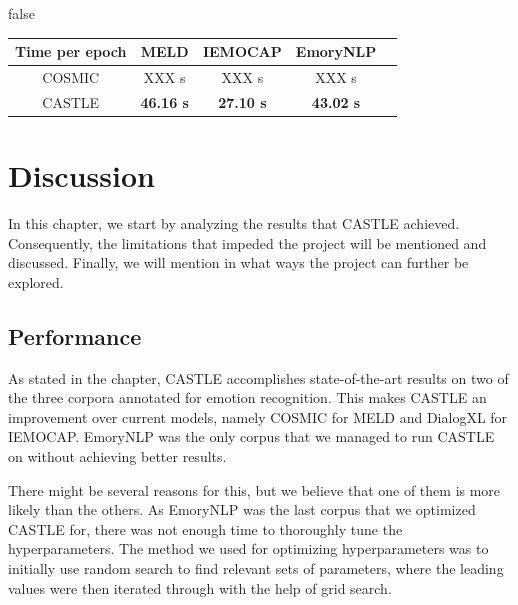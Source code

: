 \documentclass[nofilelist]{cslthse-msc}
\begin{document}



\ifx false
\begin{table}[h!]
\begin{tabular}{|c|c|c|c|c|}
\hline
Time per epoch & MELD             & IEMOCAP          & EmoryNLP          \\ \hline
COSMIC         & XXX s            & XXX s          & XXX s                  \\ \hline
CASTLE         & \textbf{46.16 s} & \textbf{27.10 s} & \textbf{43.02 s}       \\ \hline
\end{tabular}
\end{table}
\fi





\chapter{Discussion}
In this chapter, we start by analyzing the results that CASTLE achieved. Consequently, the limitations that impeded the project will be mentioned and discussed. Finally, we will mention in what ways the project can further be explored. 






\section{Performance}

As stated in the  chapter, CASTLE accomplishes state-of-the-art results on two of the three corpora annotated for emotion recognition. This makes CASTLE an improvement over current models, namely COSMIC for MELD and DialogXL for IEMOCAP. EmoryNLP was the only corpus that we managed to run CASTLE on without achieving better results. 

There might be several reasons for this, but we believe that one of them is more likely than the others. As EmoryNLP was the last corpus that we optimized CASTLE for, there was not enough time to thoroughly tune the hyperparameters. The method we used for optimizing hyperparameters was to initially use random search to find relevant sets of parameters, where the leading values were then iterated through with the help of grid search. 
\end{document}
